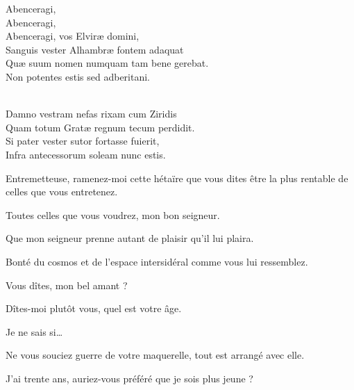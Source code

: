 \begin{drama}
  \choirspeaks
  \begin{minipage}[t]{\linewidth}
  \em

    {\footnotesize Abenceragi,\endnote{\abenceragiendnote}}           \\  %
    {\small Abenceragi,}           \\  %
  Abenceragi, vos Elviræ domini,           \\  %
  Sanguis vester Alhambræ fontem adaquat  \\  %
  Quæ suum nomen numquam tam bene gerebat. \\  %
  Non potentes estis sed adberitani.     \\
    \phantom{Non potentes estis sed adberitani.}     \\
    \phantom{Non potentes estis sed adberitani.}    
\vspace{1em}

  Damno vestram nefas rixam cum Ziridis   \\  %
  Quam totum Gratæ regnum tecum perdidit. \\  %
  Si pater vester sutor fortasse fuierit, \\  %
  Infra antecessorum soleam nunc estis.
  \end{minipage}


  \elenaspeaks Entremetteuse, ramenez-moi cette hétaïre que vous dites être la plus rentable de celles que vous entretenez.

  \maquerellespeaks Toutes celles que vous voudrez, mon bon seigneur.


  \maquerellespeaks Que mon seigneur prenne autant de plaisir qu’il lui plaira.

  \exit{\maquerelle{}}

  \elenaspeaks Bonté du cosmos et de l’espace intersidéral comme vous lui ressemblez.

  \elaspeaks Vous dîtes, mon bel amant ?

  \elenaspeaks Dîtes-moi plutôt vous, quel est votre âge.

  \elaspeaks Je ne sais si…

  \elenaspeaks Ne vous souciez guerre de votre maquerelle, tout est arrangé avec elle.

  \elaspeaks J’ai trente ans, auriez-vous préféré que je sois plus jeune ?


\end{drama}
